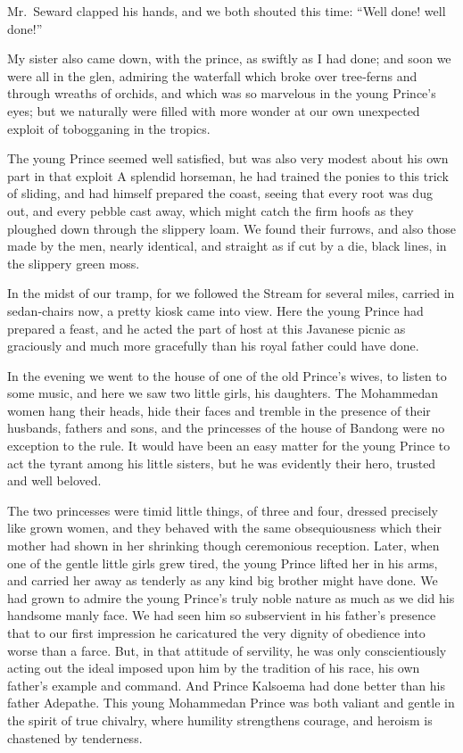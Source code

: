 \documentclass[12pt]{book}
\begin{document}
Mr.~Seward clapped his hands, and we both shouted this time: “Well done!
well done!”

My sister also came down, with the prince, as swiftly as I had done; and soon
we were all in the glen, admiring the waterfall which broke over tree‐ferns and
through wreaths of orchids, and which was so marvelous in the young Prince’s
eyes; but we naturally were filled with more wonder at our own unexpected
exploit of tobogganing in the tropics.

The young Prince seemed well satisfied, but was also very modest about his
own part in that exploit A splendid horseman, he had trained the ponies to this
trick of sliding, and had himself prepared the coast, seeing that every root was
dug out, and every pebble cast away, which might catch the firm hoofs as they
ploughed down through the slippery loam. We found their furrows, and also
those made by the men, nearly identical, and straight as if cut by a die, black lines,
in the slippery green moss.

In the midst of our tramp, for we followed the Stream for several miles, carried
in sedan‐chairs now, a pretty kiosk came into view. Here the young Prince had
prepared a feast, and he acted the part of host at this Javanese picnic as graciously
and much more gracefully than his royal father could have done.

In the evening we went to the house of one of the old Prince’s wives, to listen
to some music, and here we saw two little girls, his daughters. The Mohammedan
women hang their heads, hide their faces and tremble in the presence of their
husbands, fathers and sons, and the princesses of the house of Bandong were no
exception to the rule. It would have been an easy matter for the young Prince to
act the tyrant among his little sisters, but he was evidently their hero, trusted and
well beloved.

The two princesses were timid little things, of three and four, dressed precisely
like grown women, and they behaved with the same obsequiousness which their
mother had shown in her shrinking though ceremonious reception. Later, when
one of the gentle little girls grew tired, the young Prince lifted her in his arms,
and carried her away as tenderly as any kind big brother might have done. We
had grown to admire the young Prince’s truly noble nature as much as we did his
handsome manly face. We had seen him so subservient in his father’s presence
that to our first impression he caricatured the very dignity of obedience into
worse than a farce. But, in that attitude of servility, he was only conscientiously
acting out the ideal imposed upon him by the tradition of his race, his own
father’s example and command. And Prince Kalsoema had done better than his
father Adepathe. This young Mohammedan Prince was both valiant and gentle in
the spirit of true chivalry, where humility strengthens courage, and heroism is
chastened by tenderness.
\end{document}
